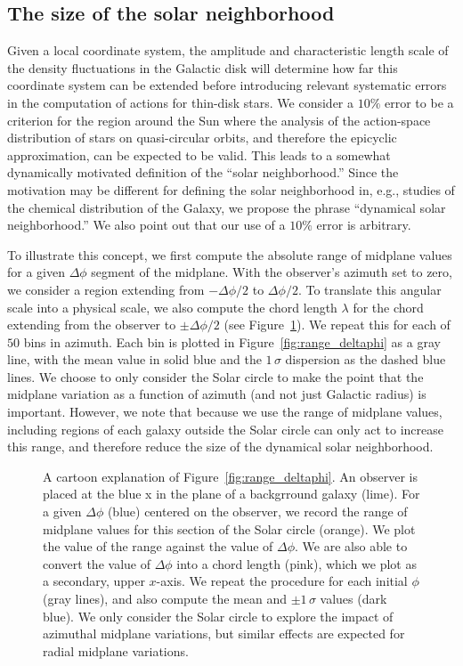\documentclass[twocolumn]{aastex62}
\begin{document}
\subsection{The size of the solar neighborhood} \label{sssec:neighborhood}
Given a local coordinate system, the amplitude and characteristic length scale
of the density fluctuations in the Galactic disk will determine how far this
coordinate system can be extended before introducing relevant systematic
errors in the computation of actions for thin-disk stars. We consider a $10\%$
error to be a criterion for the region around the Sun where the analysis of
the action-space distribution of stars on quasi-circular orbits, and therefore
the epicyclic approximation, can be expected to be valid. This leads to a
somewhat dynamically motivated definition of the ``solar neighborhood.'' Since
the motivation may be different for defining the solar neighborhood in, e.g.,
studies of the chemical distribution of the Galaxy, we propose the phrase
``dynamical solar neighborhood.'' We also point out that our use of a $10\%$
error is arbitrary.

To illustrate this concept, we first compute the absolute range of midplane
values for a given $\Delta \phi$ segment of the midplane. With the observer's
azimuth set to zero, we consider a region extending from $-\Delta \phi/2$ to
$\Delta\phi/2$. To translate this angular scale into a physical scale, we also
compute the chord length $\lambda$ for the chord extending from the observer
to $\pm \Delta\phi/2$ (see Figure~\ref{fig:fig_to_explain}). We repeat this
for each of $50$ bins in azimuth. Each bin is plotted in
Figure~\ref{fig:range_deltaphi} as a gray line, with the mean value in solid
blue and the $1\,\sigma$ dispersion as the dashed blue lines. We choose to
only consider the Solar circle to make the point that the midplane variation
as a function of azimuth (and not just Galactic radius) is important. However,
we note that because we use the range of midplane values, including regions of
each galaxy outside the Solar circle can only act to increase this range, and
therefore reduce the size of the dynamical solar neighborhood.

\begin{figure}
\caption{A cartoon explanation of Figure~\ref{fig:range_deltaphi}. An observer
is placed at the blue x in the plane of a backgrround galaxy (lime). For a
given $\Delta \phi$ (blue) centered on the observer, we record the range of
midplane values for this section of the Solar circle (orange). We plot the
value of the range against the value of $\Delta \phi$. We are also able to
convert the value of $\Delta \phi$ into a chord length (pink), which we plot
as a secondary, upper $x$-axis. We repeat the procedure for each initial
$\phi$ (gray lines), and also compute the mean and $\pm1\,\sigma$ values (dark
blue). We only consider the Solar circle to explore the impact of azimuthal
midplane variations, but similar effects are expected for radial midplane
variations.}
\label{fig:fig_to_explain}
\end{figure}
\end{document}
